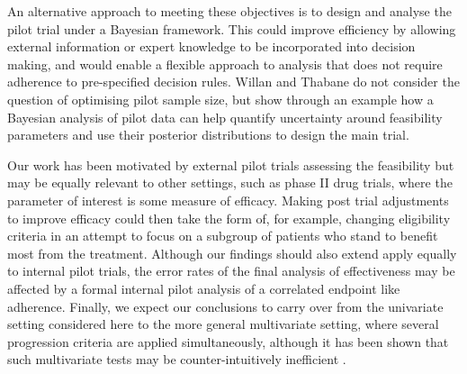 \documentclass{bmcart}
\begin{document}
An alternative approach to meeting these objectives is to design and analyse the pilot trial under a Bayesian framework\cite{Hampson2017, Wilson2021}. This could improve efficiency by allowing external information or expert knowledge to be incorporated into decision making, and would enable a flexible approach to analysis that does not require adherence to pre-specified decision rules. Willan and Thabane \cite{Willan2020} do not consider the question of optimising pilot sample size, but show through an example how a Bayesian analysis of pilot data can help quantify uncertainty around feasibility parameters and use their posterior distributions to design the main trial. 


Our work has been motivated by external pilot trials assessing the feasibility but may be equally relevant to other settings, such as phase II drug trials, where the parameter of interest is some measure of efficacy. Making post trial adjustments to improve efficacy could then take the form of, for example, changing eligibility criteria in an attempt to focus on a subgroup of patients who stand to benefit most from the treatment. Although our findings should also extend apply equally to internal  pilot trials, the error rates of the final analysis of effectiveness may be affected by a formal internal pilot analysis of a correlated endpoint like adherence. Finally, we expect our conclusions to carry over from the univariate setting considered here to the more general multivariate setting, where several progression criteria are applied simultaneously, although it has been shown that such multivariate tests may be counter-intuitively inefficient \cite{Wilson2021a}.
\end{document}
